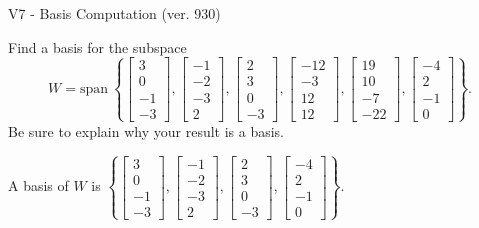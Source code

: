 \begin{exercise}
  \begin{exerciseTitle}V7 - Basis Computation (ver. 930)\end{exerciseTitle}
  \begin{exerciseStatement}
    Find a basis for the subspace 
\[W=\mathrm{span}\ \left\{\left[\begin{array}{r}
3 \\
0 \\
-1 \\
-3
\end{array}\right] , \left[\begin{array}{r}
-1 \\
-2 \\
-3 \\
2
\end{array}\right] , \left[\begin{array}{r}
2 \\
3 \\
0 \\
-3
\end{array}\right] , \left[\begin{array}{r}
-12 \\
-3 \\
12 \\
12
\end{array}\right] , \left[\begin{array}{r}
19 \\
10 \\
-7 \\
-22
\end{array}\right] , \left[\begin{array}{r}
-4 \\
2 \\
-1 \\
0
\end{array}\right]\right\}.\]
 Be sure to explain why your result is a basis.


  \end{exerciseStatement}
  \begin{exerciseAnswer}
   A basis of \(W\) is  \(\left\{\left[\begin{array}{r}
3 \\
0 \\
-1 \\
-3
\end{array}\right] , \left[\begin{array}{r}
-1 \\
-2 \\
-3 \\
2
\end{array}\right] , \left[\begin{array}{r}
2 \\
3 \\
0 \\
-3
\end{array}\right] , \left[\begin{array}{r}
-4 \\
2 \\
-1 \\
0
\end{array}\right]\right\}\).
  


  \end{exerciseAnswer}
\end{exercise}